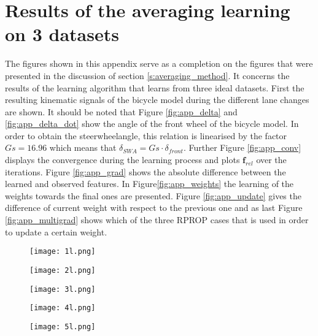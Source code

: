 \chapter{Results of the averaging learning on 3 datasets}
\label{app:C}
The figures shown in this appendix serve as a completion on the figures that were presented in the discussion of section \ref{s:averaging_method}. It concerns the results of the learning algorithm that learns from three ideal datasets. First the resulting kinematic signals of the bicycle model during the different lane changes are shown. It should be noted that Figure \ref{fig:app_delta} and \ref{fig:app_delta_dot} show the angle of the front wheel of the bicycle model. In order to obtain the steerwheelangle, this relation is linearised by the factor $Gs = 16.96$ which means that $\delta_{SWA} = Gs\cdot\delta_{front}$. Further Figure \ref{fig:app_conv} displays the convergence during the learning process and plots $\bm{f}_{rel}$ over the iterations. Figure \ref{fig:app_grad} shows the absolute difference between the learned and observed features. In Figure\ref{fig:app_weights} the learning of the weights towards the final ones are presented. Figure \ref{fig:app_update} gives the difference of current weight with respect to the previous one and as last Figure \ref{fig:app_multigrad} shows which of the three RPROP cases that is used in order to update a certain weight. 

 
\begin{figure}[h!]
	\texttt{[image: 1l.png]}
\end{figure}

\begin{figure}[h!]
	\centering
	\texttt{[image: 2l.png]}
	\label{fig:lat_acc_val}
\end{figure}

\begin{figure}[h!]
	\centering
	\texttt{[image: 3l.png]}
	\label{fig:lat_acc_val}
\end{figure}


\begin{figure}[h!]
	\centering
	\texttt{[image: 4l.png]}
	\label{fig:lat_acc_val}
\end{figure}


\begin{figure}[h!]
	\centering
	\texttt{[image: 5l.png]}
	\label{fig:lat_acc_val}
\end{figure}


